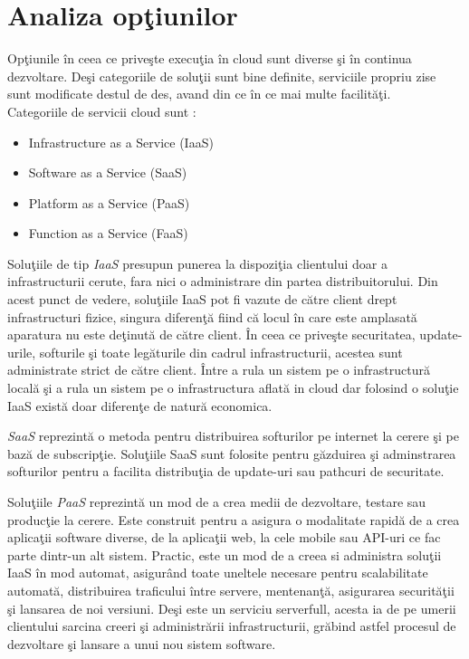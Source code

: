 \documentclass[a4paper,12pt]{report}
\begin{document}
\section{Analiza opţiunilor}
\quad Opţiunile în ceea ce priveşte execuţia în cloud sunt diverse şi în continua dezvoltare. Deşi categoriile de soluţii sunt bine definite, serviciile propriu zise sunt modificate destul de des, avand din ce în ce mai multe facilităţi. \\
Categoriile de servicii cloud sunt : 
\begin{itemize}
\item Infrastructure as a Service (IaaS)
\item Software as a Service (SaaS) 
\item Platform as a Service (PaaS) 
\item Function as a Service (FaaS) 
\end{itemize}
\par Soluţiile de tip \emph{IaaS} presupun punerea la dispoziţia clientului doar a infrastructurii cerute, fara nici o administrare din partea distribuitorului. Din acest punct de vedere, soluţiile IaaS pot fi vazute de către client drept infrastructuri fizice, singura diferenţă fiind că locul în care este amplasată aparatura nu este deţinută de către client. În ceea ce priveşte securitatea, update-urile, softurile şi toate legăturile din cadrul infrastructurii, acestea sunt administrate strict de către client. Între a rula un sistem pe o infrastructură locală şi a rula un sistem pe o infrastructura aflată in cloud dar folosind o soluţie IaaS există doar diferenţe de natură economica. 

\par \emph{SaaS} reprezintă o metoda pentru distribuirea softurilor pe internet la cerere şi pe bază de subscripţie. Soluţiile SaaS sunt folosite pentru găzduirea şi adminstrarea softurilor pentru a facilita distribuţia de update-uri sau pathcuri de securitate.

\par Soluţiile \emph{PaaS} reprezintă un mod de a crea medii de dezvoltare, testare sau producţie la cerere. Este construit pentru a asigura o modalitate rapidă de a crea aplicaţii software diverse, de la aplicaţii web, la cele mobile sau API-uri ce fac parte dintr-un alt sistem. Practic, este un mod de a creea si administra soluţii IaaS în mod automat, asigurând toate uneltele necesare pentru scalabilitate automată, distribuirea traficului între servere, mentenanţă, asigurarea securităţii şi lansarea de noi versiuni. Deşi este un serviciu serverfull, acesta ia de pe umerii clientului sarcina creeri şi administrării infrastructurii, grăbind astfel procesul de dezvoltare şi lansare a unui nou sistem software.
\end{document}
